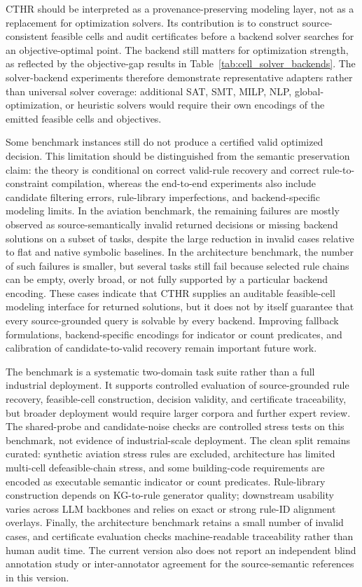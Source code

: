 ﻿\documentclass[a4paper,fleqn]{cas-dc}
\newcommand{\CTHR}{\textsc{CTHR}}
\begin{document}
\CTHR{} should be interpreted as a provenance-preserving modeling layer, not as
a replacement for optimization solvers. Its contribution is to construct
source-consistent feasible cells and audit certificates before a backend solver
searches for an objective-optimal point. The backend still matters for
optimization strength, as reflected by the objective-gap results in
Table~\ref{tab:cell_solver_backends}. The solver-backend experiments therefore
demonstrate representative adapters rather than universal solver coverage:
additional SAT, SMT, MILP, NLP, global-optimization, or heuristic solvers would
require their own encodings of the emitted feasible cells and objectives.

Some benchmark instances still do not produce a certified valid optimized
decision. This limitation should be distinguished from the semantic preservation
claim: the theory is conditional on correct valid-rule recovery and correct
rule-to-constraint compilation, whereas the end-to-end experiments also include
candidate filtering errors, rule-library imperfections, and backend-specific
modeling limits. In the aviation benchmark, the remaining failures are mostly
observed as source-semantically invalid returned decisions or missing backend
solutions on a subset of tasks, despite the large reduction in invalid cases
relative to flat and native symbolic baselines. In the architecture benchmark,
the number of such failures is smaller, but several tasks still fail because
selected rule chains can be empty, overly broad, or not fully supported by a
particular backend encoding. These cases indicate that \CTHR{} supplies an
auditable feasible-cell modeling interface for returned solutions, but it does
not by itself guarantee that every source-grounded query is solvable by every
backend. Improving fallback formulations, backend-specific encodings for
indicator or count predicates, and calibration of candidate-to-valid recovery
remain important future work.

The benchmark is a systematic two-domain task suite rather than a full
industrial deployment. It supports controlled evaluation of source-grounded rule
recovery, feasible-cell construction, decision validity, and certificate
traceability, but broader deployment would require larger corpora and further
expert review. The shared-probe and candidate-noise checks are controlled
stress tests on this benchmark, not evidence of industrial-scale deployment.
The clean split remains curated: synthetic aviation stress rules
are excluded, architecture has limited multi-cell defeasible-chain stress, and
some building-code requirements are encoded as executable semantic indicator or
count predicates. Rule-library construction depends on KG-to-rule generator
quality; downstream usability varies across LLM backbones and relies on exact
or strong rule-ID alignment overlays. Finally, the architecture benchmark
retains a small number of invalid cases, and certificate evaluation checks
machine-readable traceability rather than human audit time. The current version also does not
report an independent blind annotation study or inter-annotator agreement for
the source-semantic references in this version.
\end{document}
